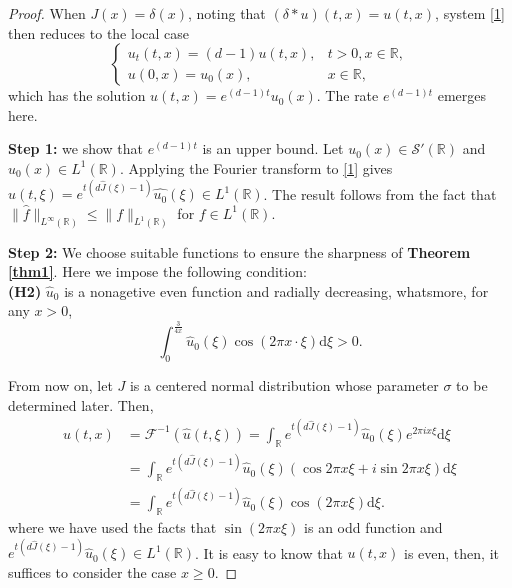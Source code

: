 \documentclass[12pt]{article}
\newcommand{\R}{\mathbb{R}}
\newcommand{\dd}{\mathrm{d}}
\begin{document}
\begin{proof}
When \( J(x) = \delta(x) \), noting that \( (\delta * u)(t,x) = u(t,x) \), system \eqref{1} then reduces to the local case
\begin{equation*}
\begin{cases}
u_t(t,x) = (d-1)u(t,x), & t > 0, x \in \mathbb{R}, \\
u(0,x) = u_0(x), & x \in \mathbb{R},
\end{cases}
\end{equation*}
which has the solution \( u(t,x) = e^{(d-1)t}u_0(x) \). The rate \(e^{(d-1)t}\) emerges here.

{\bf Step 1:} we show that \(e^{(d-1)t}\) is an upper bound. Let $u_{0}(x)\in \mathscr{S}'(\mathbb{R})$ and $\hat{u}_{0}(x)\in L^{1}(\R)$. Applying the Fourier transform to \eqref{1} gives
\(\hat{u}(t,\xi) = e^{t(d\hat{J}(\xi)-1)}\hat{u_0}(\xi)\in L^1(\R)\). The result follows from the fact that $\parallel \hat{f}\parallel_{L^{\infty}(\mathbb{R})}\leq\parallel f\parallel_{L^{1}(\mathbb{R})}$ for $f\in L^{1}(\R)$.

{\bf Step 2:} We choose suitable functions to ensure the sharpness of \textbf{Theorem \ref{thm1}}. Here we impose the following condition:\\
\textbf{(H2)} \(\hat{u}_0\) is a nonagetive even function and radially decreasing, whatsmore, for any \(x>0\),
\begin{equation}\label{h2}
	\int_0^{\frac{3}{4x}}\hat{u}_0(\xi)\cos(2\pi x\cdot\xi)\dd\xi>0.
\end{equation}

From now on, let \(J\) is a centered normal distribution whose parameter \(\sigma\) to be determined later. Then,
\begin{align*}
	u(t,x) &= \mathscr{F}^{-1}\left(\hat{u}(t,\xi)\right) = \int_{\mathbb{R}} e^{t(d\hat{J}(\xi)-1)}\hat{u}_0(\xi)e^{2\pi i x \xi}\dd \xi \\
	&= \int_{\mathbb{R}} e^{t(d\hat{J}(\xi)-1)}\hat{u}_0(\xi)(\cos 2\pi x \xi + i \sin 2\pi x \xi)\dd \xi \\
	&= \int_{\mathbb{R}} e^{t(d\hat{J}(\xi)-1)}\hat{u}_0(\xi)\cos(2\pi x \xi)\dd \xi.
\end{align*}
where we have used the facts that \(\sin (2\pi x \xi)\) is an odd function and \(e^{t(d\hat{J}(\xi)-1)}\hat{u}_0(\xi)\in L^1(\R)\). It is easy to know that \(u(t,x)\) is even, then, it suffices to consider the case \(x \geq 0\). 


\end{proof}
\end{document}
